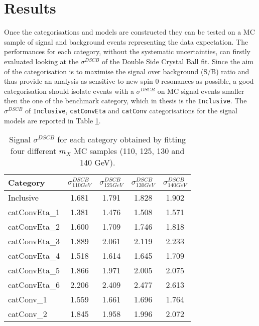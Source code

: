 \documentclass[a4paper, oneside, 11pt, openright]{book}
\begin{document}
 		\section{Results}
 			Once the categorisations and models are constructed they can be tested on a MC sample of signal and background events representing the data expectation. The performances for each category, without the systematic uncertainties, can firstly evaluated looking at the $\sigma^{DSCB}$ of the Double Side Crystal Ball fit. Since the aim of the categorisation is to maximise the signal over background (S/B) ratio and thus provide an analysis as sensitive to new spin-0 resonances as possible, a good categorisation should isolate events with a $\sigma^{DSCB}$ on MC signal events smaller then the one of the benchmark category, which in thesis is the \texttt{Inclusive}. The $\sigma^{DSCB}$ of \texttt{Inclusive}, \texttt{catConvEta} and \texttt{catConv} categorisations for the signal models are reported in Table \ref{tab:sigma}.
 			\begin{table}[tbp]
 				\centering
 				\begin{tabular}{lcccc}
 					\toprule[1.5pt]
 					Category		& $\sigma^{DSCB}_{110 GeV}$	& $\sigma^{DSCB}_{125 GeV}$	& $\sigma^{DSCB}_{130 GeV}$ 	& $\sigma^{DSCB}_{140 GeV}$ 	\\
 					\midrule
 					Inclusive 		& 1.681 	& 1.791 	& 1.828 	& 1.902	\\ 
 					\midrule
 					catConvEta\_1 	& 1.381 	& 1.476 	& 1.508 	& 1.571 	\\
 					catConvEta\_2 	& 1.600 	& 1.709  	& 1.746 	& 1.818 	\\ 
 					catConvEta\_3 	& 1.889 	& 2.061 	& 2.119 	& 2.233 	\\ 
 					catConvEta\_4 	& 1.518 	& 1.614 	& 1.645 	& 1.709 	\\ 
 					catConvEta\_5 	& 1.866 	& 1.971 	& 2.005 	& 2.075 	\\ 
 					catConvEta\_6 	& 2.206 	& 2.409 	& 2.477 	& 2.613 	\\
 					\midrule 
 					catConv\_1 		& 1.559 	& 1.661 	& 1.696 	& 1.764 	\\
 					catConv\_2 		& 1.845 	& 1.958 	& 1.996 	& 2.072 	\\
 					\bottomrule[1.5pt]
 				\end{tabular}
 				\caption{Signal $\sigma^{DSCB}$ for each category obtained by fitting four different $m_X$ MC samples (110, 125, 130 and 140 GeV).}
 				\label{tab:sigma}
 			\end{table}
\end{document}
